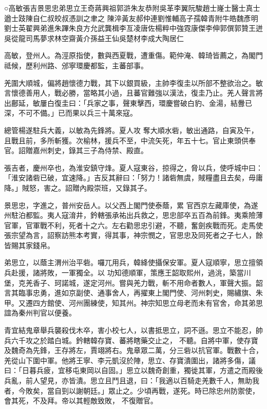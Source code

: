 
\begin{pinyinscope}

 ○高敏張吉景思忠弟思立王奇蔣興祖郭滸朱友恭附吳革李翼阮駿趙士嶐士醫士真士遒士跂陳自仁叔皎叔憑訓之聿之
 陳淬黃友郝仲連劉惟輔高子孺韓青附牛皓魏彥明劉士英翟興弟進朱蹕朱良方允武龔楫李亙凌唐佐楊粹中強霓康傑李伸郭僎郭贊王迸吳從龍司馬夢求林空齋黃介孫益王仙吳楚材李成大陶居仁



 高敏，登州人。為涇原指使，數與西夏戰，遭重傷。範仲淹、韓琦皆薦之，為閣門祗候，歷利州路、邠寧環慶都監，主蕃部事。



 羌圍大順城，偏將趙懷德力戰，其下以銀買級，主帥李復圭以所部不整欲治之。敏言懷德善用人，戰必勝，當略其小過，且蕃官難強以漢法，復圭乃止。羌人聲言將出鄜延，敏屢白復圭曰：「兵家之事，聲東擊西，環慶嘗破白豹、金湯，結釁已深，不可不備。」已而果以兵三十萬來寇。



 總管楊遂駐兵大義，以敏為先鋒將。夏人攻
 奪大順水砦，敏出通路，自寅及午，且戰且前，多所斬獲。次榆林，援兵不至，中流矢死，年五十七。官止東頭供奉官。詔贈嘉州刺史，錄其三子為侍禁、殿直。



 張吉者，慶州卒也，為淮安鎮守烽。夏人寇東谷，掠得之，脅以兵，使呼城中曰：「淮安諸砦已破，宜速降。」吉反其辭曰：「努力！諸砦無虞，賊糧盡且去矣，毋庸降。」賊怒，害之。詔贈內殿崇班，又錄其子。



 景思忠，字進之，普州安岳人。以父西上閣門使泰蔭，累
 官西京左藏庫使，為遂州駐泊都監。夷人寇淯井，鈐轄張承祐出兵救之，思忠部卒五百為前鋒。夷乘險薄官軍，官軍戰不利，死者十之六。左右勸思忠引避，不聽，奮劍疾戰而死。走馬使張宗望為言，詔察訪熊本考實，得其事，神宗憫之，官思忠及同死者之子七人，餘皆賜其家錢帛。



 弟思立，以蔭主渭州治平砦。囉兀用兵，韓絳使攝保安軍。夏人寇順寧，思立擅領兵赴援，諸將敗，一軍獨全。以
 功知德順軍，策應王韶取熙州，過洮，築當川堡，克羌香子、珂諾城，遂定河州。嘗與羌力戰，斬不用命者數人，軍聲大振。韶言其臨事忠勇，進如京副使、通事舍人，再擢東上閣門使、河州刺史，賜繡旗、朱甲。又遷四方館使、河州團練使，知其州。神宗知思立母老而未有官舍，命其弟思誼為秦州判官以便養。



 青宜結鬼章舉兵襲殺伐木卒，害小校七人，以書抵思立，詞不遜。思立不能忍，帥兵六千攻之於踏白城。鈐轄韓存寶、蕃將瞎藥交止之，
 不聽。自將中軍，使存寶及魏奇為先鋒，王存將左，賈翊將右。鬼章眾二萬，分三砦以抗官軍。戰數十合，羌從山下圍中軍。他將王寧、李元凱沒於陣，思立、存寶潰圍出，諸將多傷，議曰：「日暮兵疲，宜移屯東岡以自固。」思立以魏奇創重，獨徙其軍，方遣之而殿後兵亂，前人望見，亦皆潰。思立且鬥且退，曰：「我適以百騎走羌數千人，無助我者，今敗矣，當自剄以謝朝廷。」眾止之。少頃再戰，遂死。時已除忠州防禦使，會其死，不及拜。帝以其輕敵致敗，
 不復贈官。




\end{pinyinscope}
